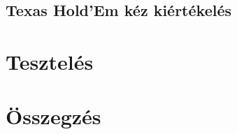 \documentclass[]{thesis-ekf}
\theoremstyle{definition}
\theoremstyle{remark}
\begin{document}
\section{Texas Hold'Em kéz kiértékelés}

\chapter{Tesztelés}

\chapter*{Összegzés}

\begin{thebibliography}{2}

\end{thebibliography}

%
\end{document}
